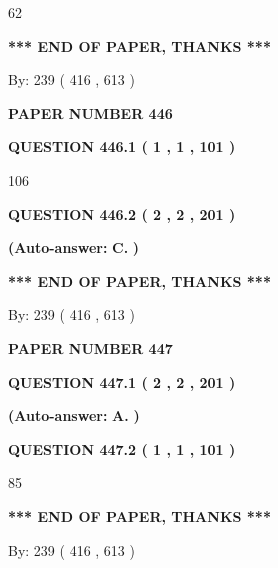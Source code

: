 \documentclass{ctexart}
\begin{document}
62
   
   
   
   
\vspace{1.0in} 
{\textbf{\large{ *** END OF PAPER, THANKS *** }}} 
   
   
\hspace{1.0in} By: 
 239 ( 416 ,  613 )
   
   
   
   
\newpage 
\setcounter{page}{ 
   446001 } 
   
   
 {\textbf{ \Large{ PAPER NUMBER  446  }}}
   
   
   
   
  
  
{\textbf{\large{QUESTION
446.1 
 ( 1 , 1 , 101 )
}}}

106
  
  
{\textbf{\large{QUESTION
446.2 
 ( 2 , 2 , 201 )
}}}
 
 
{\textbf{(Auto-answer:}}
{\textbf{\large{
C.}}}
{\textbf{)}}
 
 
   
   
   
   
\vspace{1.0in} 
{\textbf{\large{ *** END OF PAPER, THANKS *** }}} 
   
   
\hspace{1.0in} By: 
 239 ( 416 ,  613 )
   
   
   
   
\newpage 
\setcounter{page}{ 
   447001 } 
   
   
 {\textbf{ \Large{ PAPER NUMBER  447  }}}
   
   
   
   
  
  
{\textbf{\large{QUESTION
447.1 
 ( 2 , 2 , 201 )
}}}
 
 
{\textbf{(Auto-answer:}}
{\textbf{\large{
A.}}}
{\textbf{)}}
 
 
  
  
{\textbf{\large{QUESTION
447.2 
 ( 1 , 1 , 101 )
}}}

85
   
   
   
   
\vspace{1.0in} 
{\textbf{\large{ *** END OF PAPER, THANKS *** }}} 
   
   
\hspace{1.0in} By: 
 239 ( 416 ,  613 )
   
   
   
   
\newpage 
\setcounter{page}{ 
   448001 } 
   
\end{document}
